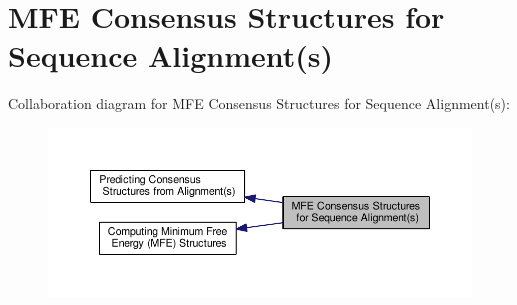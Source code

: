 \hypertarget{group__consensus__mfe__fold}{\section{M\-F\-E Consensus Structures for Sequence Alignment(s)}
\label{group__consensus__mfe__fold}
}
Collaboration diagram for M\-F\-E Consensus Structures for Sequence Alignment(s)\-:
\nopagebreak
\begin{figure}[H]
\begin{center}
\leavevmode
\includegraphics[width=350pt]{group__consensus__mfe__fold}
\end{center}
\end{figure}
